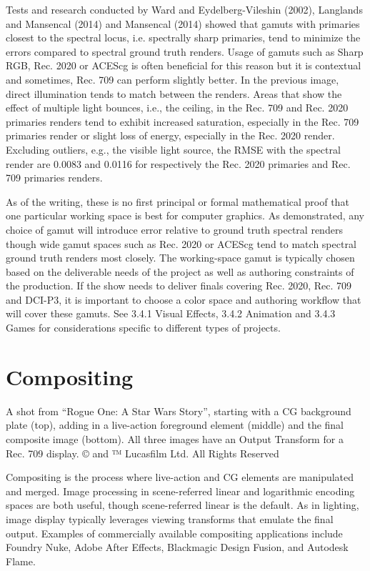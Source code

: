 Tests and research conducted by Ward and Eydelberg-Vileshin (2002), Langlands and Mansencal (2014) and Mansencal (2014) showed that gamuts with primaries closest to the spectral locus, i.e. spectrally sharp primaries, tend to minimize the errors compared to spectral ground truth renders. 
Usage of gamuts such as Sharp RGB, Rec. 2020 or ACEScg is often beneficial for this reason but it is contextual and sometimes, Rec. 709 can perform slightly better. In the previous image, direct illumination tends to match between the renders. Areas that show the effect of multiple light bounces, i.e., the ceiling, in the Rec. 709 and Rec. 2020 primaries renders tend to exhibit increased saturation, especially in the Rec. 709 primaries render or slight loss of energy, especially in the Rec. 2020 render. Excluding outliers, e.g., the visible light source, the RMSE with the spectral render are 0.0083 and 0.0116 for respectively the Rec. 2020 primaries and Rec. 709 primaries renders.

As of the writing, these is no first principal or formal mathematical proof that one particular working space is best for computer graphics. As demonstrated, any choice of gamut will introduce error relative to ground truth spectral renders though wide gamut spaces such as Rec. 2020 or ACEScg tend to match spectral ground truth renders most closely. The working-space gamut is typically chosen based on the deliverable needs of the project as well as authoring constraints of the production. If the show needs to deliver finals covering Rec. 2020, Rec. 709 and DCI-P3, it is important to choose a color space and authoring workflow that will cover these gamuts. See 3.4.1 Visual Effects, 3.4.2 Animation and 3.4.3 Games for considerations specific to different types of projects.


\section{Compositing}




A shot from “Rogue One: A Star Wars Story”, starting with a CG background plate (top), adding in a live-action foreground element (middle) and the final composite image (bottom). All three images have an Output Transform for a Rec. 709 display. 
© and ™ Lucasfilm Ltd. All Rights Reserved

Compositing is the process where live-action and CG elements are manipulated and merged. Image processing in scene-referred linear and logarithmic encoding spaces are both useful, though scene-referred linear is the default. As in lighting, image display typically leverages viewing transforms that emulate the final output. Examples of commercially available compositing applications include Foundry Nuke, Adobe After Effects, Blackmagic Design Fusion, and Autodesk Flame.

